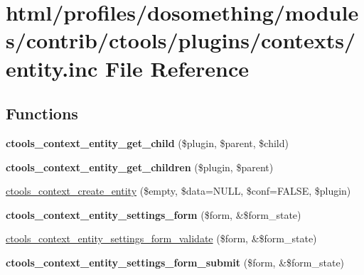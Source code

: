 \hypertarget{profiles_2dosomething_2modules_2contrib_2ctools_2plugins_2contexts_2entity_8inc}{
\section{html/profiles/dosomething/modules/contrib/ctools/plugins/contexts/entity.inc File Reference}
\label{profiles_2dosomething_2modules_2contrib_2ctools_2plugins_2contexts_2entity_8inc}
}
\subsection*{Functions}
\begin{DoxyCompactItemize}
\item 
\hypertarget{profiles_2dosomething_2modules_2contrib_2ctools_2plugins_2contexts_2entity_8inc_a79a3c97a84fa740e5a9cf632fd934520}{
{\bfseries ctools\_\-context\_\-entity\_\-get\_\-child} (\$plugin, \$parent, \$child)}
\label{profiles_2dosomething_2modules_2contrib_2ctools_2plugins_2contexts_2entity_8inc_a79a3c97a84fa740e5a9cf632fd934520}

\item 
\hypertarget{profiles_2dosomething_2modules_2contrib_2ctools_2plugins_2contexts_2entity_8inc_a4a5518114498a64158ec4695fd793782}{
{\bfseries ctools\_\-context\_\-entity\_\-get\_\-children} (\$plugin, \$parent)}
\label{profiles_2dosomething_2modules_2contrib_2ctools_2plugins_2contexts_2entity_8inc_a4a5518114498a64158ec4695fd793782}

\item 
\hyperlink{profiles_2dosomething_2modules_2contrib_2ctools_2plugins_2contexts_2entity_8inc_af4533bf4379c92e7c7c244654fbff6db}{ctools\_\-context\_\-create\_\-entity} (\$empty, \$data=NULL, \$conf=FALSE, \$plugin)
\item 
\hypertarget{profiles_2dosomething_2modules_2contrib_2ctools_2plugins_2contexts_2entity_8inc_af06c9cda03427a4260f1b851e8824cac}{
{\bfseries ctools\_\-context\_\-entity\_\-settings\_\-form} (\$form, \&\$form\_\-state)}
\label{profiles_2dosomething_2modules_2contrib_2ctools_2plugins_2contexts_2entity_8inc_af06c9cda03427a4260f1b851e8824cac}

\item 
\hyperlink{profiles_2dosomething_2modules_2contrib_2ctools_2plugins_2contexts_2entity_8inc_a65bdc35857e126643659af44b8b7cf04}{ctools\_\-context\_\-entity\_\-settings\_\-form\_\-validate} (\$form, \&\$form\_\-state)
\item 
\hypertarget{profiles_2dosomething_2modules_2contrib_2ctools_2plugins_2contexts_2entity_8inc_a5b21d4dbb887a525b8d1e37b564c8925}{
{\bfseries ctools\_\-context\_\-entity\_\-settings\_\-form\_\-submit} (\$form, \&\$form\_\-state)}
\label{profiles_2dosomething_2modules_2contrib_2ctools_2plugins_2contexts_2entity_8inc_a5b21d4dbb887a525b8d1e37b564c8925}


\end{DoxyCompactItemize}
